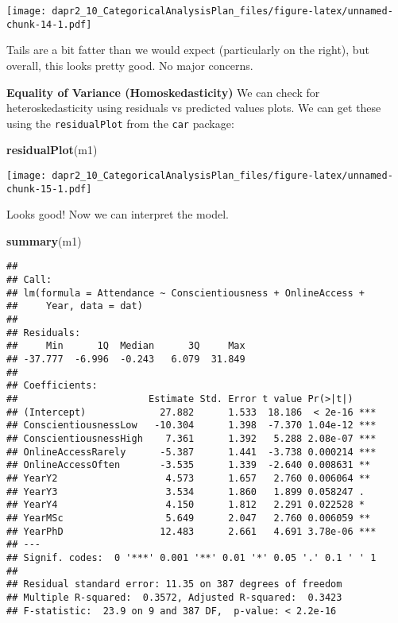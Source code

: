 \documentclass[
]{article}
\newenvironment{Shaded}{\begin{snugshade}}{\end{snugshade}}
\newcommand{\FunctionTok}[1]{\textcolor[rgb]{0.13,0.29,0.53}{\textbf{#1}}}
\newcommand{\NormalTok}[1]{#1}
\begin{document}
\texttt{[image: dapr2\_10\_CategoricalAnalysisPlan\_files/figure-latex/unnamed-chunk-14-1.pdf]}

Tails are a bit fatter than we would expect (particularly on the right), but overall, this looks pretty good. No major concerns.

\textbf{Equality of Variance (Homoskedasticity)}
We can check for heteroskedasticity using residuals vs predicted values plots. We can get these using the \texttt{residualPlot} from the \texttt{car} package:

\begin{Shaded}
\begin{Highlighting}[]
\FunctionTok{residualPlot}\NormalTok{(m1)}
\end{Highlighting}
\end{Shaded}

\texttt{[image: dapr2\_10\_CategoricalAnalysisPlan\_files/figure-latex/unnamed-chunk-15-1.pdf]}

Looks good! Now we can interpret the model.

\begin{Shaded}
\begin{Highlighting}[]
\FunctionTok{summary}\NormalTok{(m1)}
\end{Highlighting}
\end{Shaded}

\begin{verbatim}
## 
## Call:
## lm(formula = Attendance ~ Conscientiousness + OnlineAccess + 
##     Year, data = dat)
## 
## Residuals:
##     Min      1Q  Median      3Q     Max 
## -37.777  -6.996  -0.243   6.079  31.849 
## 
## Coefficients:
##                       Estimate Std. Error t value Pr(>|t|)    
## (Intercept)             27.882      1.533  18.186  < 2e-16 ***
## ConscientiousnessLow   -10.304      1.398  -7.370 1.04e-12 ***
## ConscientiousnessHigh    7.361      1.392   5.288 2.08e-07 ***
## OnlineAccessRarely      -5.387      1.441  -3.738 0.000214 ***
## OnlineAccessOften       -3.535      1.339  -2.640 0.008631 ** 
## YearY2                   4.573      1.657   2.760 0.006064 ** 
## YearY3                   3.534      1.860   1.899 0.058247 .  
## YearY4                   4.150      1.812   2.291 0.022528 *  
## YearMSc                  5.649      2.047   2.760 0.006059 ** 
## YearPhD                 12.483      2.661   4.691 3.78e-06 ***
## ---
## Signif. codes:  0 '***' 0.001 '**' 0.01 '*' 0.05 '.' 0.1 ' ' 1
## 
## Residual standard error: 11.35 on 387 degrees of freedom
## Multiple R-squared:  0.3572, Adjusted R-squared:  0.3423 
## F-statistic:  23.9 on 9 and 387 DF,  p-value: < 2.2e-16
\end{verbatim}
\end{document}
